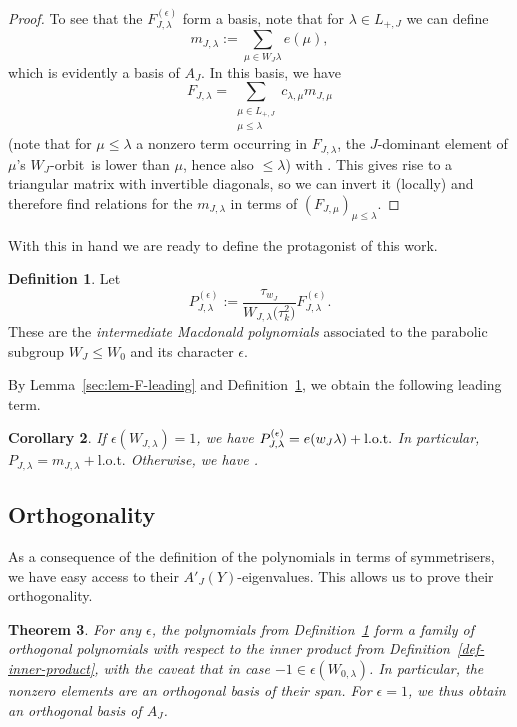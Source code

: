 \documentclass[10pt,a4paper]{amsart}
\newtheorem{Theorem}{Theorem}[section]
\newtheorem{Corollary}[Theorem]{Corollary}
\theoremstyle{definition}
\newtheorem{Definition}[Theorem]{Definition}
\numberwithin{equation}{section}
\begin{document}
\begin{proof}
 To see that the $F^{(\epsilon)}_{J,\lambda}$ form a basis, note that for $\lambda\in L_{+,J}$ we can define
 \[
 m_{J,\lambda}:= \sum_{\mu\in W_J\lambda} e(\mu),
 \]
 which is evidently a basis of $A_J$. In this basis, we have
 \[
 F_{J,\lambda} = \sum_{\substack{\mu\in L_{+,J}\\\mu\le\lambda}} c_{\lambda,\mu} m_{J,\mu}
 \]
 (note that for $\mu\le\lambda$ a nonzero term occurring in $F_{J,\lambda}$, the $J$-dominant
 element of $\mu$'s $W_J$-orbit~is lower than $\mu$, hence also $\le \lambda$) with
 . This gives rise to a triangular matrix
 with invertible diagonals, so we can invert it (locally) and therefore find relations for the
 $m_{J,\lambda}$ in terms of $(F_{J,\mu})_{\mu\le\lambda}$.
\end{proof}

With this in hand we are ready to define the protagonist of this work.
\begin{Definition}\label{sec:def-P}
 Let
 \[
 P^{(\epsilon)}_{J,\lambda} := \frac{\tau_{w_J}}{W_{J,\lambda}\bigl(\tau_k^2\bigr)} F^{(\epsilon)}_{J,\lambda}.
 \]
 These are the \emph{intermediate Macdonald polynomials} associated to the parabolic subgroup
 \linebreak ${W_J \le W_0}$ and its character $\epsilon$.
\end{Definition}

By Lemma~\ref{sec:lem-F-leading} and Definition~\ref{sec:def-P}, we obtain
the following leading term.

\begin{Corollary}\label{sec:cor-leading-coeffs}
 If $\epsilon(W_{J,\lambda})=1$, we have
$\smash{P^{(\epsilon)}_{J,\lambda} = e(w_J \lambda)} +\text{l.o.t.}$
 In particular,
$
 P_{J,\lambda} = m_{J,\lambda} +\text{l.o.t.}$
 Otherwise, we have
.
\end{Corollary}

\subsection{Orthogonality}
As a consequence of the definition of the polynomials  in terms of symmetrisers, we have easy access to their
$A'_J(Y)$-eigenvalues. This allows us to prove their orthogonality.


\begin{Theorem}\label{sec:thm-ortho}
 For any $\epsilon$, the polynomials  from Definition~{\rm\ref{sec:def-P}} form a family of
 orthogonal polynomials with respect to the inner product from Definition~{\rm\ref{def-inner-product}}, with the caveat that  in
 case $-1\in\epsilon(W_{0,\lambda})$.
 In particular, the nonzero elements are an orthogonal basis of their
 span. For $\epsilon=1$, we thus obtain an orthogonal basis of $A_J$.
\end{Theorem}
\end{document}
